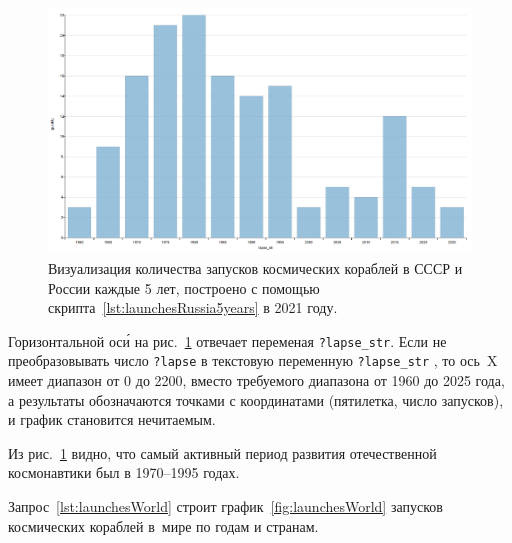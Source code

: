 \begin{figure}[h!]
  \includegraphics[width=\linewidth]{graphics/chapter/spacecraft_space_station/ImgRU.png}
  \caption[График запусков в СССР и России (по 5 лет)]{Визуализация количества запусков космических кораблей в СССР и России каждые 5 лет, построено с помощью скрипта~\protect\ref{lst:launchesRussia5years} в 2021 году.}%
  \label{fig:launchesRussia5years}%
\end{figure}

Горизонтальной ос\'{и} на рис.~\ref{fig:launchesRussia5years} отвечает переменая \mbox{\lstinline|?lapse_str|.} 
Если не преобразовывать число \lstinline|?lapse| 
в текстовую переменную \mbox{\lstinline|?lapse_str|}%
, то ось~X имеет диапазон от 0 до 2200, 
вместо требуемого диапазона от 1960 до 2025 года, 
а результаты обозначаются точками с координатами (пятилетка, число запусков), 
и график становится нечитаемым. 

Из рис.~\ref{fig:launchesRussia5years} видно, 
что самый активный период развития отечественной космонавтики был в 1970--1995 годах.

Запрос~\ref{lst:launchesWorld} строит график~\ref{fig:launchesWorld} 
запусков космических кораблей в~мире по годам и странам.

